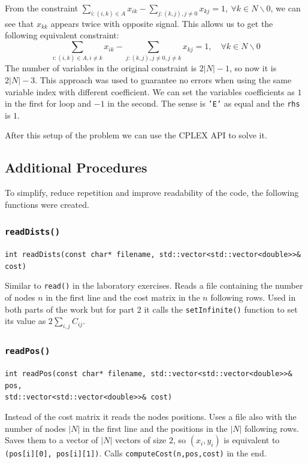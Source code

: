\documentclass[a4paper,12pt]{article}
\begin{document}
			From the constraint $ \sum_{i:(i,k)\in A} x_{ik} - \sum_{j:(k,j),j\ne 0} x_{kj} = 1, \ \forall k \in N \backslash 0 $,	we can see that $x_{kk}$ appears twice with opposite signal.
			This allows us to get the following equivalent constraint:
			\begin{equation}
				\sum_{i:(i,k)\in A,i\ne k} x_{ik} - \sum_{j:(k,j),j\ne 0, j \ne k} x_{kj} = 1,  \quad \forall k \in N \backslash 0
			\end{equation}
			The number of variables in the original constraint is $2|N|-1 $, so now it is $ 2|N|-3 $.
			This approach was used to guarantee no errors when using the same variable index with different coefficient.
			We can set the variables coefficients as $ 1 $ in the first for loop and $ -1 $ in the second.
			The sense is \texttt{'E'} as equal and the \texttt{rhs} is $ 1 $.
			
			After this setup of the problem we can use the CPLEX API to solve it.
			
		\subsection{Additional Procedures}		 
			To simplify, reduce repetition and improve readability of the code, the following functions were created.
			
			\subsubsection{\texttt{readDists()}}
			\hspace{-20pt}\texttt{int readDists(const char* filename, std::vector<std::vector<double>>\& cost)}
					
				Similar to \texttt{read()} in the laboratory exercises. 
				Reads a file containing the number of nodes $ n $ in the first line and the cost matrix in the $ n $ following rows.
				Used in both parts of the work but for part 2 it calls the \texttt{setInfinite()} function to set its value as $ 2 \sum_{i,j} C_{ij}  $.
			
			\subsubsection{\texttt{readPos()}}
			\hspace{-20pt}\texttt{int readPos(const char* filename, std::vector<std::vector<double>>\& pos, \\ std::vector<std::vector<double>>\& cost)}
					
				Instead of the cost matrix it reads the nodes positions.
				Uses a file also with the number of nodes $ |N| $ in the first line and the positions in the $ |N| $ following rows.
				Saves them to a vector of $ |N| $ vectors of size $ 2 $, so $ (x_i, y_i) $ is equivalent to \texttt{(pos[i][0], pos[i][1])}.
				Calls \texttt{computeCost(n,pos,cost)} in the end.
				
\end{document}
